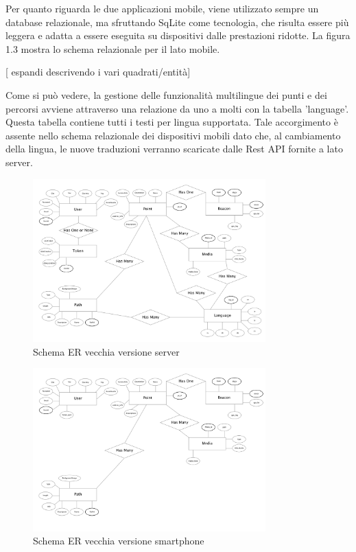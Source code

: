 	Per quanto riguarda le due applicazioni mobile, viene utilizzato sempre un database relazionale, ma sfruttando SqLite come tecnologia, che risulta essere più leggera e adatta a essere eseguita su dispositivi dalle prestazioni ridotte. La figura 1.3 mostra lo schema relazionale per il lato mobile.\vspace{5mm}
	
	[ espandi descrivendo i vari quadrati/entità]

Come si può vedere, la gestione delle funzionalità multilingue dei punti e dei percorsi avviene attraverso una relazione da uno a molti con la tabella 'language'. Questa tabella contiene tutti i testi per lingua supportata. Tale accorgimento è assente nello schema relazionale dei dispositivi mobili dato che, al cambiamento della lingua, le nuove traduzioni verranno scaricate dalle Rest API fornite a lato server.


\begin{figure}[h]
\centering
\includegraphics[width=0.8\textwidth]{images/erOld.png}
\caption{Schema ER vecchia versione server}
\end{figure}

\begin{figure}[h]
\centering
\includegraphics[width=0.8\textwidth]{images/erOldSpartphone.png}
\caption{Schema ER vecchia versione smartphone}
\end{figure}
\vspace{5mm}






